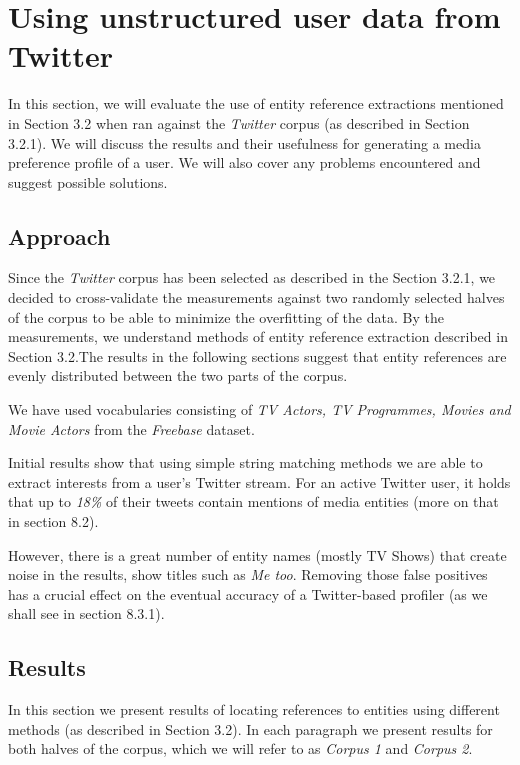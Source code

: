 \section{Using unstructured user data from Twitter}

In this section, we will evaluate the use of entity reference extractions
mentioned in Section 3.2 when ran against the \textit{Twitter} corpus (as described in Section 3.2.1).
We will discuss the results and their usefulness for generating a media preference profile of a user.
We will also cover any problems encountered and suggest possible solutions.

\subsection{Approach}
Since the \textit{Twitter} corpus has been selected as described in the Section 3.2.1,
we decided to cross-validate the measurements against two randomly selected halves of the corpus
to be able to minimize the overfitting of the data. By the measurements, we understand methods
of entity reference extraction described in Section 3.2.The results in the following sections suggest
that entity references are evenly distributed between the two parts of the corpus.

We have used vocabularies consisting of \textit{TV Actors, TV Programmes, Movies and Movie Actors} from
the \textit{Freebase} dataset.

Initial results show that using simple string matching methods we are able to extract interests from
a user's Twitter stream. For an active Twitter user, it holds that up to \textit{18\%} of their tweets
contain mentions of media entities (more on that in section 8.2).

However, there is a great number of entity names (mostly TV Shows) that create noise in the results, \eg show titles such as \textit{Me too}. Removing those false positives has a crucial effect on the eventual accuracy of a Twitter-based profiler
(as we shall see in section 8.3.1).

\subsection{Results}
In this section we present results of locating references to entities using different methods (as described in Section 3.2).
In each paragraph we present results for both halves of the corpus, which we will refer to as \textit{Corpus 1} and
\textit{Corpus 2}.

